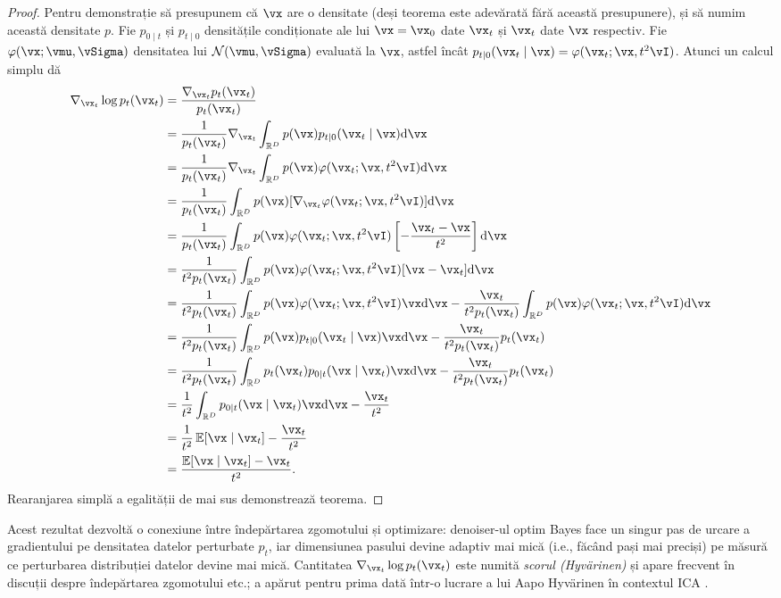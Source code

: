 \documentclass[../../book-main_ro.tex]{subfiles}
\begin{document}
\begin{proof}
	Pentru demonstrație să presupunem că \(\vx\) are o densitate (deși teorema
	este adevărată fără această presupunere), și să numim această densitate \(p\). Fie
	\(p_{0 \mid t}\) și \(p_{t \mid 0}\) densitățile condiționate ale lui \(\vx
	= \vx_{0}\) date \(\vx_{t}\) și \(\vx_{t}\) date \(\vx\) respectiv.
	Fie \(\phi(\vx ; \vmu, \vSigma)\) densitatea lui \(\dNorm(\vmu,
	\vSigma)\) evaluată la \(\vx\), astfel încât \(p_{t \mid 0}(\vx_{t} \mid \vx)
	= \phi(\vx_{t} ; \vx, t^{2}\vI)\). Atunci un calcul simplu dă
	\begin{align}
		\nabla_{\vx_{t}} \log p_{t}(\vx_{t})
		&= \frac{\nabla_{\vx_{t}}p_{t}(\vx_{t})}{p_{t}(\vx_{t})} \\
		&= \frac{1}{p_{t}(\vx_{t})}\nabla_{\vx_{t}}\int_{\R^{D}}p(\vx)p_{t \mid 0}(\vx_{t} \mid \vx)\odif{\vx} \\
		&=
		\frac{1}{p_{t}(\vx_{t})}\nabla_{\vx_{t}}\int_{\R^{D}}p(\vx)\phi(\vx_{t}
		;\vx, t^{2}\vI)\odif{\vx} \\
		&=
		\frac{1}{p_{t}(\vx_{t})}\int_{\R^{D}}p(\vx)[\nabla_{\vx_{t}}\phi(\vx_{t}
		;\vx, t^{2}\vI)]\odif{\vx} \\
		&= \frac{1}{p_{t}(\vx_{t})}\int_{\R^{D}}p(\vx)\phi(\vx_{t} ; \vx, t^{2}\vI)\bs{-\frac{\vx_{t} - \vx}{t^{2}}}\odif{\vx} \\
		&= \frac{1}{t^{2}p_{t}(\vx_{t})}\int_{\R^{D}}p(\vx)\phi(\vx_{t} ; \vx, t^{2}\vI)[\vx - \vx_{t}]\odif{\vx} \\
		&= \frac{1}{t^{2}p_{t}(\vx_{t})}\int_{\R^{D}}p(\vx)\phi(\vx_{t} ; \vx,
		t^{2}\vI)\vx \odif{\vx}
		- \frac{\vx_{t}}{t^{2}p_{t}(\vx_{t})}\int_{\R^{D}}p(\vx)\phi(\vx_{t} ; \vx, t^{2}\vI)\odif{\vx} \\
		&= \frac{1}{t^{2}p_{t}(\vx_{t})}\int_{\R^{D}}p(\vx)p_{t \mid 0}(\vx_{t} \mid \vx)\vx \odif{\vx} - \frac{\vx_{t}}{t^{2}p_{t}(\vx_{t})}p_{t}(\vx_{t}) \\
		&= \frac{1}{t^{2}p_{t}(\vx_{t})}\int_{\R^{D}}p_{t}(\vx_{t})p_{0 \mid t}(\vx \mid \vx_{t})\vx \odif{\vx} - \frac{\vx_{t}}{t^{2}p_{t}(\vx_{t})}p_{t}(\vx_{t}) \\
		&= \frac{1}{t^{2}}\int_{\R^{D}}p_{0 \mid t}(\vx \mid \vx_{t})\vx \odif{\vx} - \frac{\vx_{t}}{t^{2}} \\
		&= \frac{1}{t^{2}}\Ex[\vx \mid \vx_{t}] - \frac{\vx_{t}}{t^{2}} \\
		&= \frac{\Ex[\vx \mid \vx_{t}] - \vx_{t}}{t^{2}}.
	\end{align}
	Rearanjarea simplă a egalității de mai sus demonstrează teorema.
\end{proof}
Acest rezultat dezvoltă o conexiune între îndepărtarea zgomotului și optimizare: denoiser-ul optim Bayes face un singur pas de urcare a gradientului pe densitatea datelor perturbate \(p_{t}\), iar dimensiunea pasului devine adaptiv mai mică (i.e., făcând pași mai preciși) pe măsură ce perturbarea distribuției datelor devine mai mică. Cantitatea \(\nabla_{\vx_{t}}\log p_{t}(\vx_{t})\) este numită \textit{scorul (Hyv\"arinen)} și apare frecvent în discuții despre îndepărtarea zgomotului etc.; a apărut pentru prima dată într-o lucrare a lui Aapo Hyv\"arinen în contextul ICA \cite{hyvarinen05a}.
\end{document}
